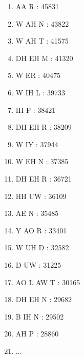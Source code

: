\documentclass[notes]{beamer}
\begin{document}
{\begin{tiny}
\begin{multicols}{4}
\begin{enumerate}
	\item AA R : 45831
	\item W AH N : 43822
	\item W AH T : 41575
	\item DH EH M : 41320
	\item W ER : 40475
	\item W IH L : 39733
	\item IH F : 38421
	\item DH EH R : 38209
	\item W IY : 37944
	\item W EH N : 37385
	\item DH EH R : 36721
	\item HH UW : 36109
	\item AE N : 35485
	\item Y AO R : 33401
	\item W UH D : 32582
	\item D UW : 31225
	\item AO L AW T : 30165
	\item DH EH N : 29682
	\item B IH N : 29502
	\item AH P : 28860
	\item[] $\ldots$
\end{enumerate}
\end{multicols}
\end{tiny}
}
\end{document}

